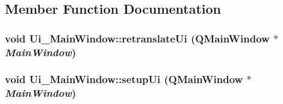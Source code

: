 \subsection{Member Function Documentation}
\hypertarget{classUi__MainWindow_a097dd160c3534a204904cb374412c618}{
\subsubsection[{retranslateUi}]{\setlength{\rightskip}{0pt plus 5cm}void Ui\_\-MainWindow::retranslateUi (QMainWindow $\ast$ {\em MainWindow})}}
\label{classUi__MainWindow_a097dd160c3534a204904cb374412c618}
\hypertarget{classUi__MainWindow_acf4a0872c4c77d8f43a2ec66ed849b58}{
\subsubsection[{setupUi}]{\setlength{\rightskip}{0pt plus 5cm}void Ui\_\-MainWindow::setupUi (QMainWindow $\ast$ {\em MainWindow})}}
\label{classUi__MainWindow_acf4a0872c4c77d8f43a2ec66ed849b58}


